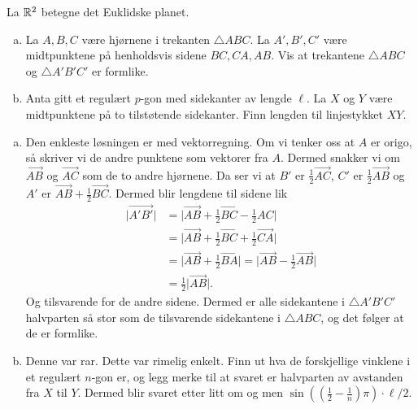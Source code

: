 \documentclass[11pt, norsk]{article}
\begin{document}
\begin{oppg}
  La $\mathbb{R}^2$ betegne det Euklidske planet.

  \begin{enumerate}[a)]
  \item La $A,B,C$ være hjørnene i trekanten $\triangle ABC$. La $A',B',C'$ være midtpunktene på henholdsvis sidene $BC,CA,AB$. Vis at trekantene $\triangle ABC$ og $\triangle A'B'C'$ er formlike.
\item Anta gitt et regulært $p$-gon med sidekanter av lengde $\ell$.  La $X$ og $Y$ være midtpunktene på to tilstøtende sidekanter. Finn lengden til linjestykket $XY$.
  \end{enumerate}
\end{oppg}

\begin{losn}
  \begin{enumerate}[a)]
  \item Den enkleste løsningen er med vektorregning. Om vi tenker oss at $A$ er origo, så skriver vi de andre punktene som vektorer fra $A$. Dermed snakker vi om  $\vec{AB}$ og $\vec{AC}$ som de to andre hjørnene. Da ser vi at $B'$ er $\frac 12 \vec{AC}$, $C'$ er $\frac 12 \vec{AB}$ og $A'$ er $\vec {AB} + \frac 12 \vec {BC}$. Dermed blir lengdene til sidene lik 
\begin{align*}
\lvert \vec{A'B'} \rvert &= \lvert \vec{AB} + \frac 12 \vec {BC} - \frac 12 {AC} \rvert \\
&= \lvert \vec{AB} + \frac 12 \vec{BC} + \frac 12 \vec {CA} \rvert
\\ &= \lvert \vec{AB} + \frac 12 \vec{BA} \rvert = \lvert \vec{AB} -\frac 12 \vec{AB} \rvert \\
&=\frac 12 \lvert \vec{AB} \rvert.
\end{align*}
Og tilsvarende for de andre sidene. Dermed er alle sidekantene i $\triangle A'B'C'$ halvparten så stor som de tilsvarende sidekantene i $\triangle ABC$, og det følger at de er formlike.

\item Denne var rar. Dette var rimelig enkelt. Finn ut hva de forskjellige vinklene i et regulært $n$-gon er, og legg merke til at svaret er halvparten av avstanden fra $X$ til $Y$. Dermed blir svaret etter litt om og men $\sin \left( (\frac 12 - \frac 1n) \pi \right) \cdot \ell/2$.
  \end{enumerate}
  \begin{figure}
\begin{center}
\end{center}
\end{figure}
\end{losn}
\end{document}
